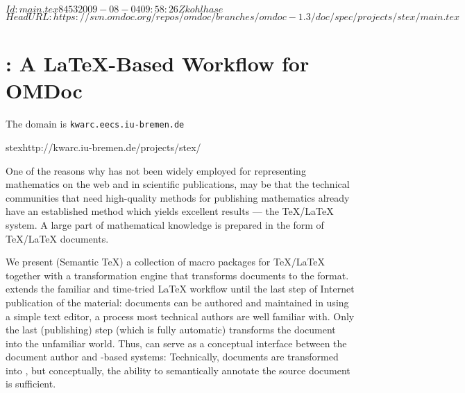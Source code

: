 \svnInfo $Id: main.tex 8453 2009-08-04 09:58:26Z kohlhase $
\svnKeyword $HeadURL: https://svn.omdoc.org/repos/omdoc/branches/omdoc-1.3/doc/spec/projects/stex/main.tex $

\section{\protect\stex: A {\LaTeX}-Based Workflow for OMDoc}
\begin{erratum}[reported-by=Christoph Lange,date=2006-12-12]{The domain is \texttt{kwarc.eecs.iu-bremen.de}}
\begin{project}{stex}{http://kwarc.iu-bremen.de/projects/stex/}
\end{project}
\end{erratum}

One of the reasons why {\omdoc} has not been widely employed for representing mathematics
on the web and in scientific publications, may be that the technical communities that need
high-quality methods for publishing mathematics already have an established method which
yields excellent results --- the {\TeX/\LaTeX} system. A large part of mathematical
knowledge is prepared in the form of {\TeX}/{\LaTeX} documents.

We present {\stex} (Semantic {\TeX}) a collection of macro packages for {\TeX/\LaTeX}
together with a transformation engine that transforms {\stex} documents to the {\omdoc}
format. {\stex} extends the familiar and time-tried {\LaTeX} workflow until the last step
of Internet publication of the material: documents can be authored and maintained in
{\stex} using a simple text editor, a process most technical authors are well familiar
with. Only the last (publishing) step (which is fully automatic) transforms the document
into the unfamiliar {\xml} world. Thus, {\stex} can serve as a conceptual interface
between the document author and {\omdoc}-based systems: Technically, {\stex} documents are
transformed into {\omdoc}, but conceptually, the ability to semantically annotate the
source document is sufficient.


